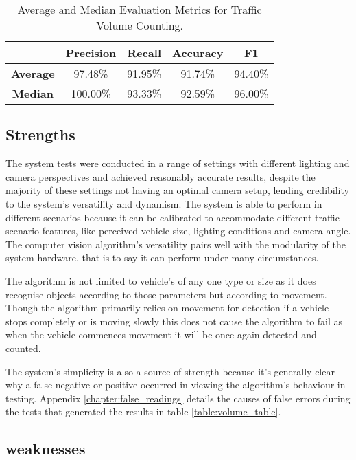 \begin{table}[H]
\centering
\begin{tabular}{|ccccc|}
    \hline
                    &\textbf{Precision}&\textbf{Recall}&\textbf{Accuracy}&\textbf{F1}\\\hline
    \textbf{Average}&97.48\%&91.95\%&91.74\%&94.40\%\\\hline
    \textbf{Median}&100.00\%&93.33\%&92.59\%&96.00\%\\\hline
\end{tabular}
\caption{Average and Median Evaluation Metrics for Traffic Volume Counting.}
\label{table:averages}
\end{table}

\subsection{Strengths}

The system tests were conducted in a range of settings with different lighting and camera perspectives and achieved reasonably accurate results, despite the majority of these settings not having an optimal camera setup, lending credibility to the system's versatility and dynamism. The system is able to perform in different scenarios because it can be calibrated to accommodate different traffic scenario features, like perceived vehicle size, lighting conditions and camera angle. The computer vision algorithm's versatility pairs well with the modularity of the system hardware, that is to say it can perform under many circumstances. 

The algorithm is not limited to vehicle's of any one type or size as it does recognise objects according to those parameters but according to movement. Though the algorithm primarily relies on movement for detection if a vehicle stops completely or is moving slowly this does not cause the algorithm to fail as when the vehicle commences movement it will be once again detected and counted. 

The system's simplicity is also a source of strength because it's generally clear why a false negative or positive occurred in viewing the algorithm's behaviour in testing. Appendix \ref{chapter:false_readings} details the causes of false errors during the tests that generated the results in table \ref{table:volume_table}.  

\subsection{weaknesses}

